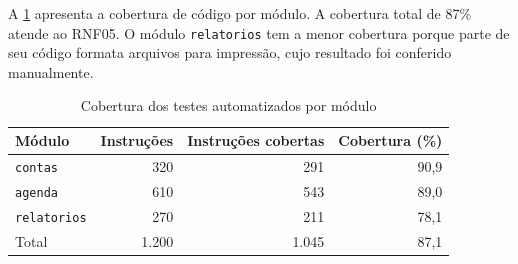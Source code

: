 A \cref{tab:cobertura} apresenta a cobertura de código por módulo. A cobertura
total de 87\% atende ao RNF05. O módulo \texttt{relatorios} tem a menor
cobertura porque parte de seu código formata arquivos para impressão, cujo
resultado foi conferido manualmente.

\begin{table}[htbp]
  \centering
  \caption{Cobertura dos testes automatizados por módulo}
  \label{tab:cobertura}
  \small
  \begin{tabular}{@{}lrrr@{}}
    \toprule
    Módulo & Instruções & Instruções cobertas & Cobertura (\%) \\
    \midrule
    \texttt{contas}     &   320 &   291 & 90,9 \\
    \texttt{agenda}     &   610 &   543 & 89,0 \\
    \texttt{relatorios} &   270 &   211 & 78,1 \\
    \midrule
    Total               & 1.200 & 1.045 & 87,1 \\
    \bottomrule
  \end{tabular}
\end{table}

